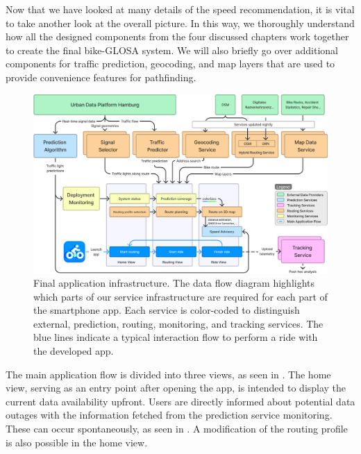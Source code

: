Now that we have looked at many details of the speed recommendation, it is vital to take another look at the overall picture. In this way, we thoroughly understand how all the designed components from the four discussed chapters work together to create the final bike-GLOSA system. We will also briefly go over additional components for traffic prediction, geocoding, and map layers that are used to provide convenience features for pathfinding.

\begin{figure}[!b]
\caption{Final application infrastructure. The data flow diagram highlights which parts of our service infrastructure are required for each part of the smartphone app. Each service is color-coded to distinguish external, prediction, routing, monitoring, and tracking services. The blue lines indicate a typical interaction flow to perform a ride with the developed app.}\label{fig:architecture}
\includegraphics[width=\linewidth]{images/architecture.png}
\end{figure}

The main application flow is divided into three views, as seen in . The home view, serving as an entry point after opening the app, is intended to display the current data availability upfront. Users are directly informed about potential data outages with the information fetched from the prediction service monitoring. These can occur spontaneously, as seen in . A modification of the routing profile is also possible in the home view.


